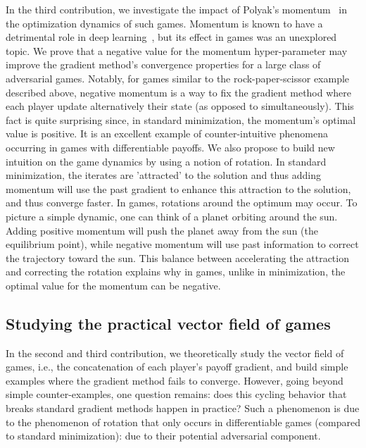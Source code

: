 In the third contribution, we investigate the impact of Polyak’s momentum~\citep{polyak1964some} in the optimization dynamics of such games. Momentum is known to have a detrimental role in deep learning~\citep{sutskever2013importance}, but its effect in games was an unexplored topic. 
We prove that a negative value for the momentum hyper-parameter may improve the gradient method’s convergence properties for a large class of adversarial games. 
Notably, for games similar to the rock-paper-scissor example described above, negative momentum is a way to fix the gradient method where each player update alternatively their state (as opposed to simultaneously). This fact is quite surprising since, in standard minimization, the momentum's optimal value is positive. It is an excellent example of counter-intuitive phenomena occurring in games with differentiable payoffs. 
We also propose to build new intuition on the game dynamics by using a notion of rotation.
In standard minimization, the iterates are ’attracted’ to the solution and thus adding momentum will use the past gradient to enhance this attraction to the solution, and thus converge faster.
In games, rotations around the optimum may occur. To picture a simple dynamic, one can think of a planet orbiting around the sun. Adding positive momentum will push the planet away from the sun (the equilibrium point), while negative momentum will use past information to correct the trajectory toward the sun. 
This balance between accelerating the attraction and correcting the rotation explains why in games, unlike in minimization, the optimal value for the momentum can be negative.










\subsection{Studying the practical vector field of games}




In the second and third contribution, we theoretically study  the vector field of games, i.e., the concatenation of each player's payoff gradient, and build simple examples where the gradient method fails to converge.
However, going beyond simple counter-examples, one question remains: does this cycling behavior that breaks standard gradient methods happen in practice? Such a phenomenon is due to the phenomenon of rotation that only occurs in differentiable games (compared to standard minimization): due to their potential adversarial component.




